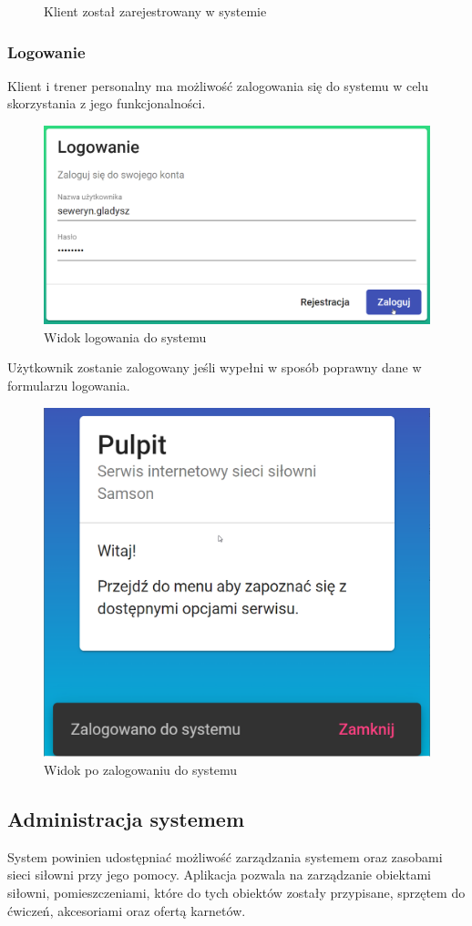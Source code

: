\documentclass[a4paper,twoside,12pt]{book}
\begin{document}
{\begin{figure}[h!]
	\caption{Klient został zarejestrowany w systemie}
	\label{fig:kontoutworzone}
\end{figure}
\FloatBarrier

\subsubsection{Logowanie}
Klient i trener personalny ma możliwość zalogowania się do systemu w celu skorzystania z jego funkcjonalności.
\begin{figure}[h!]
	\centering
	\includegraphics[width=0.75\linewidth]{../zrzuty_ekranu/dzialanie/rejestracja_logowanie/logowanie}
	\caption{Widok logowania do systemu}
	\label{fig:logowanie}
\end{figure}
\FloatBarrier
Użytkownik zostanie zalogowany jeśli wypełni w sposób poprawny dane w formularzu logowania.
\begin{figure}[h!]
	\centering
	\includegraphics[width=0.75\linewidth]{../zrzuty_ekranu/dzialanie/rejestracja_logowanie/zalogowano}
	\caption{Widok po zalogowaniu do systemu}
	\label{fig:zalogowano}
\end{figure}
\FloatBarrier

\subsection{Administracja systemem}
System powinien udostępniać możliwość zarządzania systemem oraz zasobami sieci siłowni przy jego pomocy. Aplikacja pozwala na zarządzanie obiektami siłowni, pomieszczeniami, które do tych obiektów zostały przypisane, sprzętem do ćwiczeń, akcesoriami oraz ofertą karnetów.

}
\end{document}

